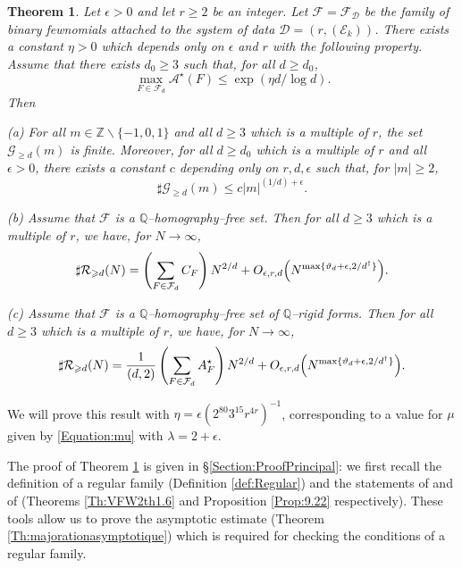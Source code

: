 \documentclass[10pt]{article}
\newtheorem{theorem}{Theorem}[section]
\theoremstyle{definition}
\numberwithin{equation}{section}
\newcommand {\Q}{{\mathbb{Q}}}
\newcommand {\Z}{{\mathbb{Z}}}
\newcommand{\calA}{\mathcal {A}}
\newcommand{\calF}{\mathcal {F}}
\newcommand{\calG}{\mathcal {G}}
\newcommand{\calR}{\mathcal {R}}
\begin{document}
 \begin{theorem} \label{Th:principal}
Let $\epsilon>0$ and let $r\geqslant 2$ be an integer. Let $\mathcal F= \mathcal F_{\boldsymbol{ \mathcal D}}$ be the family of binary fewnomials attached to the system 
of data ${\boldsymbol{ \mathcal D}} =(r, (\mathcal E_k))$. 
There exists a constant $\eta>0$ which depends only on $\epsilon$ and $r$ with the following property. 
Assume that there exists $d_0\geqslant 3$ such that, for all $d\geqslant d_0$,
\begin{equation}\label{Equation:majorationCalAeta}
\max_{F\in\calF_d}\calA^\star(F)\leqslant \exp(\eta d/\log d).
\end{equation}
Then 
 
(a) For all $m\in\Z\smallsetminus\{-1,0,1\}$ and all $d\geqslant 3$ which is a multiple of $r$, the set $\calG_{\geqslant d}(m)$ is finite. Moreover, for all $d\geqslant d_0$ which is a multiple of $r$ and all $\epsilon>0$, there exists a constant $c$ depending only on $r,d,\epsilon$ such that, for $|m|\geqslant 2$,
\[
\sharp \calG_{\geqslant d}(m)\leqslant c |m|^{(1/d)+\epsilon }.
\]

(b) 
Assume that $\mathcal F$ is a $\Q$--homography--free set. Then 
for all $d\geqslant 3$ which is a multiple of $r$, we have, for $N\to\infty$,
\begin{equation}\label{Equation:calRdN}
\sharp \calR_{\geqslant d}(N)=
\left(\sum_{F\in\calF_d} C_F\right) N^{2/d}+ O_{\epsilon,r,d} \Bigl(N^{\max\{\vartheta_{d}+\epsilon,2/d^\dag\}} \Bigr).
\end{equation}

(c) 
Assume that $\mathcal F$ is a $\Q$--homography--free set of $\Q$--rigid forms. Then 
for all $d\geqslant 3$ which is a multiple of $r$, we have, for $N\to\infty$,
\[
\sharp \calR_{\geqslant d}(N)= \frac 1{(d,2)}
\left(\sum_{F\in\calF_d} A^\star_F\right) N^{2/d}+ O_{\epsilon,r,d} \Bigl(N^{\max\{\vartheta_{d}+\epsilon,2/d^\dag\}} \Bigr).
\]
\end{theorem}

We will prove this result with $\eta=\epsilon (2^{80}3^{15}r^{4r})^{-1}$, corresponding to a value for $\mu$ given by \eqref{Equation:mu} with $\lambda=2+\epsilon$. 

 The proof of Theorem \ref{Th:principal} is given in \S \ref{Section:ProofPrincipal}: we first recall 
 the definition of a regular family \cite[Definition 2.2]{FW2} (Definition \ref{def:Regular}) and the statements of \cite[Theorem 2.6]{FW2} and of \cite[Corollary 9.22]{W} (Theorems \ref{Th:VFW2th1.6} and Proposition \ref{Prop:9.22} respectively). These tools allow us to prove the asymptotic estimate (Theorem \ref{Th:majorationasymptotique}) which is required for checking the conditions of a regular family.
 
\end{document}

